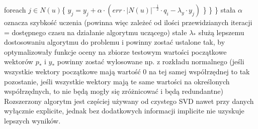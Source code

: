 \documentclass{pracamgr}
\begin{document}
     \hspace*{48pt}			foreach $j\in N(u)$\{\newline
     \hspace*{64pt}				$y_j=y_j+\alpha\cdot(err\cdot |N(u)|^{-\frac{1}{2}}\cdot q_i-\lambda_y\cdot y_j)$\newline
     \hspace*{48pt}			\}\newline
     \hspace*{32pt}		\}\newline
     \hspace*{16pt}	\}\newline
     {\scriptsize
      stała $\alpha$ oznacza szybkość uczenia (powinna więc zależeć od ilości przewidzianych iteracji = dostępnego czasu na działanie algorytmu uczącego)\newline
      stałe $\lambda_*$ służą lepszemu dostosowaniu algorytmu do problemu i powinny zostać ustalone tak, by optymalizowały funkcje oceny na zbiorze testowym\newline
      wartości początkowe wektorów $p_*$ i $y_*$ powinny zostać wylosowane np. z rozkładu normalnego
      (jeśli wszystkie wektory początkowe mają wartość $0$ na tej samej współrzędnej to tak pozostanie,
      jeśli wszystkie wektory mają te same wartości na określonych współrzędnych, to nie będą mogły się zróżnicować i będą redundantne)
     }\newline
     Rozszerzony algorytm jest częściej używany od czystego SVD nawet przy danych wyłącznie explicite,
     jednak bez dodatkowych informacji implicite nie uzyskuje lepszych wyników.
\end{document}
